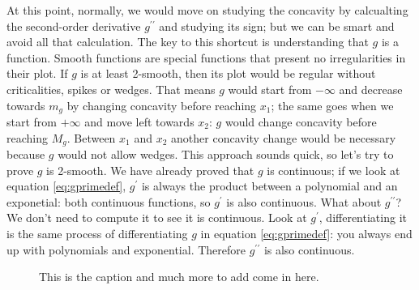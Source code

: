 At this point, normally, we would move on studying
the concavity by calcualting the second-order
derivative $g^{\prime\prime}$ and studying its sign;
but we can be smart and avoid all that calculation.
The key to this shortcut is understanding that $g$ is a
 function. Smooth functions are special functions that present
no irregularities in their plot. If $g$ is at least 2-smooth, then its plot would be regular without
criticalities, spikes or wedges.
That means $g$ would start from $-\infty$ and decrease towards $m_g$ by changing
concavity before reaching $x_1$; the same goes when we start from $+\infty$ and move left towards $x_2$:
$g$ would change concavity before reaching $M_g$. Between $x_1$ and $x_2$ another concavity change would be
necessary because $g$ would not allow wedges. This approach sounds quick, so let's try to
prove $g$ is 2-smooth. We have already proved that $g$ is continuous; if we look at
equation \ref{eq:gprimedef}, $g^\prime$ is always the product between a polynomial and an exponetial:
both continuous functions, so $g^\prime$ is also continuous.
What about $g^{\prime\prime}$? We don't need to compute it to see it is continuous.
Look at $g^\prime$, differentiating it is the same process of
differentiating $g$ in equation \ref{eq:gprimedef}: you always end up with polynomials and exponential.
Therefore $g^{\prime\prime}$ is also
continuous.

\begin{figure*}[h] %
    \caption{This is the caption and much more to add come in here.}%
    \label{fig:fplot}%
\end{figure*}

